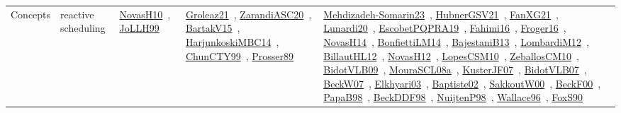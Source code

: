 {\begin{longtable}{lp{3cm}>{\raggedright\arraybackslash}p{6cm}>{\raggedright\arraybackslash}p{6cm}>{\raggedright\arraybackslash}p{8cm}}
\index{reactive scheduling}\index{Concepts!reactive scheduling}Concepts & reactive scheduling & \href{../works/NovasH10.pdf}{NovasH10}~\cite{NovasH10}, \href{../works/JoLLH99.pdf}{JoLLH99}~\cite{JoLLH99} & \href{../works/Groleaz21.pdf}{Groleaz21}~\cite{Groleaz21}, \href{../works/ZarandiASC20.pdf}{ZarandiASC20}~\cite{ZarandiASC20}, \href{../works/BartakV15.pdf}{BartakV15}~\cite{BartakV15}, \href{../works/HarjunkoskiMBC14.pdf}{HarjunkoskiMBC14}~\cite{HarjunkoskiMBC14}, \href{../works/ChunCTY99.pdf}{ChunCTY99}~\cite{ChunCTY99}, \href{../works/Prosser89.pdf}{Prosser89}~\cite{Prosser89} & \href{../works/Mehdizadeh-Somarin23.pdf}{Mehdizadeh-Somarin23}~\cite{Mehdizadeh-Somarin23}, \href{../works/HubnerGSV21.pdf}{HubnerGSV21}~\cite{HubnerGSV21}, \href{../works/FanXG21.pdf}{FanXG21}~\cite{FanXG21}, \href{../works/Lunardi20.pdf}{Lunardi20}~\cite{Lunardi20}, \href{../works/EscobetPQPRA19.pdf}{EscobetPQPRA19}~\cite{EscobetPQPRA19}, \href{../works/Fahimi16.pdf}{Fahimi16}~\cite{Fahimi16}, \href{../works/Froger16.pdf}{Froger16}~\cite{Froger16}, \href{../works/NovasH14.pdf}{NovasH14}~\cite{NovasH14}, \href{../works/BonfiettiLM14.pdf}{BonfiettiLM14}~\cite{BonfiettiLM14}, \href{../works/BajestaniB13.pdf}{BajestaniB13}~\cite{BajestaniB13}, \href{../works/LombardiM12.pdf}{LombardiM12}~\cite{LombardiM12}, \href{../works/BillautHL12.pdf}{BillautHL12}~\cite{BillautHL12}, \href{../works/NovasH12.pdf}{NovasH12}~\cite{NovasH12}, \href{../works/LopesCSM10.pdf}{LopesCSM10}~\cite{LopesCSM10}, \href{../works/ZeballosCM10.pdf}{ZeballosCM10}~\cite{ZeballosCM10}, \href{../works/BidotVLB09.pdf}{BidotVLB09}~\cite{BidotVLB09}, \href{../works/MouraSCL08a.pdf}{MouraSCL08a}~\cite{MouraSCL08a}, \href{../works/KusterJF07.pdf}{KusterJF07}~\cite{KusterJF07}, \href{../works/BidotVLB07.pdf}{BidotVLB07}~\cite{BidotVLB07}, \href{../works/BeckW07.pdf}{BeckW07}~\cite{BeckW07}, \href{../works/Elkhyari03.pdf}{Elkhyari03}~\cite{Elkhyari03}, \href{../works/Baptiste02.pdf}{Baptiste02}~\cite{Baptiste02}, \href{../works/SakkoutW00.pdf}{SakkoutW00}~\cite{SakkoutW00}, \href{../works/BeckF00.pdf}{BeckF00}~\cite{BeckF00}, \href{../works/PapaB98.pdf}{PapaB98}~\cite{PapaB98}, \href{../works/BeckDDF98.pdf}{BeckDDF98}~\cite{BeckDDF98}, \href{../works/NuijtenP98.pdf}{NuijtenP98}~\cite{NuijtenP98}, \href{../works/Wallace96.pdf}{Wallace96}~\cite{Wallace96}, \href{../works/FoxS90.pdf}{FoxS90}~\cite{FoxS90}\\

\end{longtable}}
